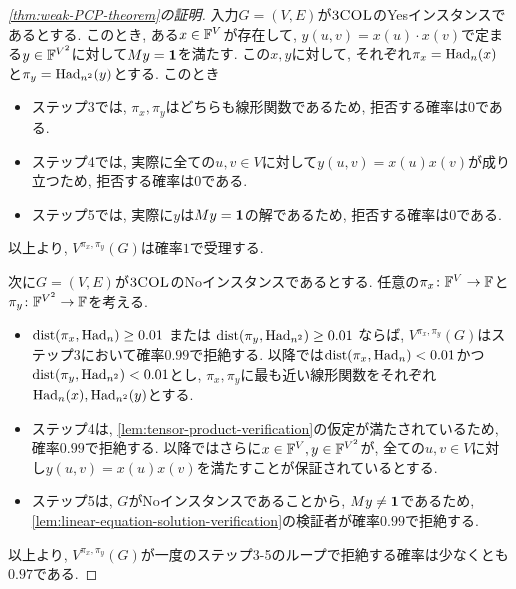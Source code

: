 \begin{proof}[\cref{thm:weak-PCP-theorem}の証明]
    入力$G=(V,E)$が$\textsc{3COL}$のYesインスタンスであるとする.
    このとき, ある$x\in\mathbb{F}^V$が存在して, $y(u,v)=x(u)\cdot x(v)$で定まる$y\in\mathbb{F}^{V^2}$に対して$My=\mathbf{1}$を満たす.
    この$x,y$に対して, それぞれ$\pi_x=\mathrm{Had}_n(x)$と$\pi_y=\mathrm{Had}_{n^2}(y)$とする.
    このとき
    \begin{itemize}
      \item ステップ3では, $\pi_x,\pi_y$はどちらも線形関数であるため, 拒否する確率は$0$である.
      \item ステップ4では, 実際に全ての$u,v\in V$に対して$y(u,v)=x(u)x(v)$が成り立つため, 拒否する確率は$0$である.
      \item ステップ5では, 実際に$y$は$My=\mathbf{1}$の解であるため, 拒否する確率は$0$である.
    \end{itemize}
    以上より, $V^{\pi_x,\pi_y}(G)$は確率$1$で受理する.

    次に$G=(V,E)$が$\textsc{3COL}$のNoインスタンスであるとする.
    任意の$\pi_x\colon\mathbb{F}^V\to\mathbb{F}$と$\pi_y\colon\mathbb{F}^{V^2}\to\mathbb{F}$を考える.

    \begin{itemize}
      \item $\mathrm{dist}(\pi_x,\mathrm{Had}_n) \ge 0.01$ または $\mathrm{dist}(\pi_y,\mathrm{Had}_{n^2})\ge 0.01$ ならば, $V^{\pi_x,\pi_y}(G)$はステップ3において確率$0.99$で拒絶する. 以降では$\mathrm{dist}(\pi_x,\mathrm{Had}_n) < 0.01$かつ$\mathrm{dist}(\pi_y,\mathrm{Had}_{n^2}) < 0.01$とし, $\pi_x,\pi_y$に最も近い線形関数をそれぞれ$\mathrm{Had}_n(x),\mathrm{Had}_{n^2}(y)$とする.
      \item ステップ4は, \cref{lem:tensor-product-verification}の仮定が満たされているため, 確率$0.99$で拒絶する. 以降ではさらに$x\in\mathbb{F}^V,y\in\mathbb{F}^{V^2}$が, 全ての$u,v\in V$に対し$y(u,v)=x(u)x(v)$を満たすことが保証されているとする.
      \item ステップ5は, $G$がNoインスタンスであることから, $My\ne\mathbf{1}$であるため, \cref{lem:linear-equation-solution-verification}の検証者が確率$0.99$で拒絶する.
    \end{itemize}
    以上より, $V^{\pi_x,\pi_y}(G)$が一度のステップ3-5のループで拒絶する確率は少なくとも$0.97$である.
  \end{proof}
    



